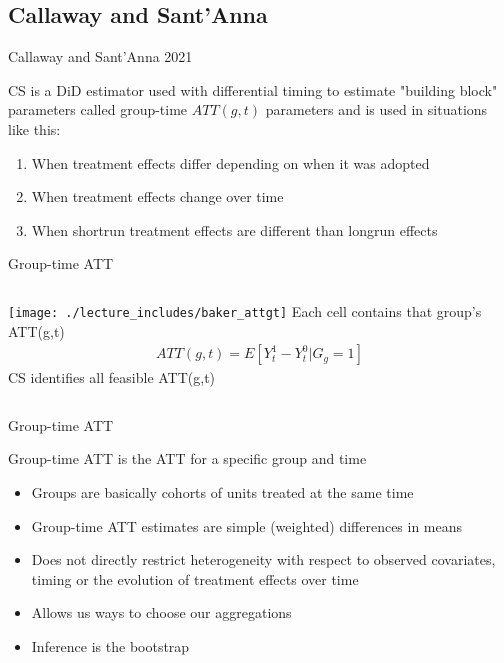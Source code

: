 \documentclass{beamer}
\begin{document}
\subsection{Callaway and Sant'Anna}



\begin{frame}{Callaway and Sant'Anna 2021}

CS is a DiD estimator used with differential timing to estimate "building block" parameters called group-time $ATT(g,t)$ parameters and is used in situations like this:

\begin{enumerate}
\item When treatment effects differ depending on when it was adopted
\item When treatment effects change over time
\item When shortrun treatment effects are different than longrun effects
\end{enumerate}


\end{frame}




\begin{frame}{Group-time ATT}
       \begin{columns}
             \centering
             \texttt{[image: ./lecture\_includes/baker\_attgt]}
            Each cell contains that group's ATT(g,t)
\begin{eqnarray*}
ATT(g,t) = E[Y_t^1 - Y_t^0 | G_g=1]
\end{eqnarray*}CS identifies all feasible ATT(g,t)
         \end{columns} 
    \end{frame}




\begin{frame}{Group-time ATT}

Group-time ATT is the ATT for a specific group and time
\begin{itemize}
\item Groups are basically cohorts of units treated at the same time
\item Group-time ATT estimates are simple (weighted) differences in means
\item Does not directly restrict heterogeneity with respect to observed covariates, timing or the evolution of treatment effects over time
\item Allows us ways to choose our aggregations
\item Inference is the bootstrap
\end{itemize}

\end{frame}
\end{document}
